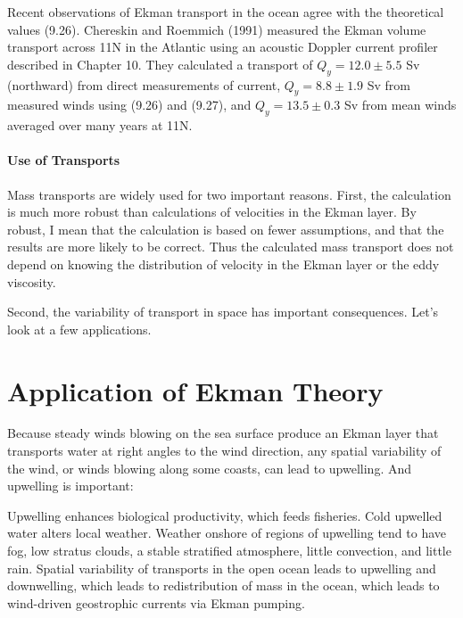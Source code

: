 Recent observations of Ekman transport in the ocean
agree with the theoretical values (9.26). Chereskin and Roemmich (1991) measured the Ekman
volume transport across 11\degrees N in the Atlantic using an acoustic Doppler current profiler
described in Chapter 10. They calculated a transport of $Q_y = 12.0
\pm 5.5$ Sv (northward) from direct measurements of current, $Q_y = 8.8 \pm 1.9$ Sv from
measured winds using (9.26) and (9.27), and $Q_y = 13.5 \pm 0.3$ Sv from mean
winds averaged over many years at 11\degrees N.

\paragraph{Use of Transports}
Mass transports are widely used for two
important reasons. First, the calculation is much more robust than calculations of velocities
in the Ekman layer. By robust, I mean that the calculation is based on fewer assumptions,
and that the results are more likely to be correct. Thus the calculated mass
transport does not depend on knowing the distribution of velocity in the Ekman
layer or the eddy viscosity.

Second, the variability of transport in space has important consequences.
Let's look at a few applications.

\section{Application of Ekman Theory}

Because steady winds blowing on the sea surface produce an Ekman layer that
transports water at right angles to the wind direction, any
spatial variability of the wind, or winds blowing along some coasts, can lead to
upwelling. And upwelling
is important:
\begin{enumerate}
\vitem Upwelling enhances biological  productivity, which feeds fisheries.
\vitem Cold upwelled water alters local weather. Weather onshore of regions of
upwelling tend to have fog, low stratus clouds, a stable
stratified atmosphere, little convection, and little rain.
\vitem Spatial variability of transports in the open ocean leads to
upwelling and downwelling, which leads to redistribution
of mass in the ocean, which leads to wind-driven geostrophic currents via Ekman pumping.
\end{enumerate}

